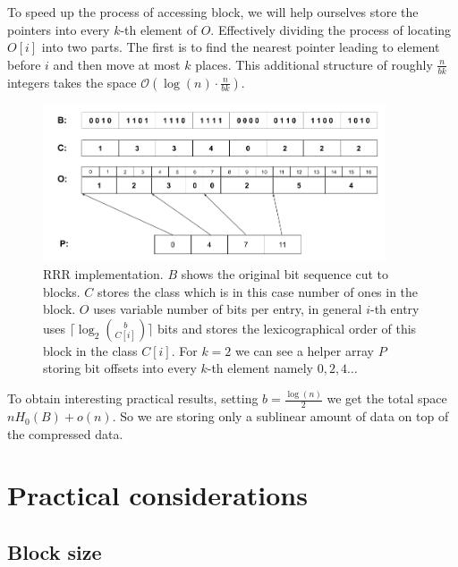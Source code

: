 To speed up the process of accessing block, we will help ourselves store the pointers
into every $k$-th element of $O$. Effectively dividing the process of locating $O[i]$ into two
parts. The first is to find the nearest pointer leading to element before $i$ and
then move at most $k$ places. This additional structure of roughly $\frac{n}{bk}$ integers
takes the space $\mathcal{O}(\log(n)\cdot \frac{n}{bk})$.

\begin{figure}
	\centerline{
		\includegraphics[width=0.9\textwidth, height=0.3\textheight]{images/rrr}
	}
	\caption[TODO]{RRR implementation. $B$ shows the original bit sequence cut to
    blocks. $C$ stores the class which is in this case number of ones in the block.
    $O$ uses variable number of bits per entry, in general $i$-th entry uses
    $\lceil \log_2{b\choose C[i]}\rceil$ bits and stores the lexicographical order
    of this block in the class $C[i]$. For $k=2$ we can see a helper array $P$
    storing bit offsets into every $k$-th element namely $0, 2, 4\ldots$
	}
	\label{obr:RRRFinal}
\end{figure}

To obtain interesting practical results, setting $b=\frac{\log(n)}{2}$ we get the total space
$nH_0(B) + o(n)$. So we are storing only a sublinear amount of data on top of the compressed
data.

\section{Practical considerations}

\subsection{Block size}

